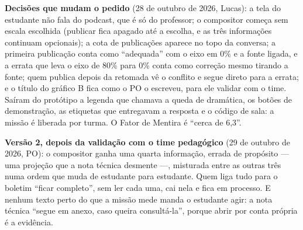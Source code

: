 \textbf{Decisões que mudam o pedido} (28 de outubro de 2026, Lucas): a tela
do estudante não fala do podcast, que é só do professor; o compositor começa
sem escala escolhida (publicar fica apagado até a escolha, e as três
informações continuam opcionais); a cota de publicações aparece no topo da
conversa; a primeira publicação conta como \enquote{adequada} com o eixo em
0\% e a fonte ligada, e a errata que leva o eixo de 80\% para 0\% conta como
correção mesmo tirando a fonte; quem publica depois da retomada vê o conflito e
segue direto para a errata; e o título do gráfico B fica como o PO o
escreveu, para ele validar com o time. Saíram do protótipo a legenda que
chamava a queda de dramática, os botões de demonstração, as etiquetas que
entregavam a resposta e o código de sala: a missão é liberada por turma. O
Fator de Mentira é \enquote{cerca de 6,3}.

\textbf{Versão 2, depois da validação com o time pedagógico} (29 de outubro
de 2026, PO): o compositor ganha uma quarta informação, errada de propósito ---
uma projeção que a nota técnica desmente ---, misturada entre as outras três
numa ordem que muda de estudante para estudante. Quem liga tudo para o boletim
\enquote{ficar completo}, sem ler cada uma, cai nela e fica em processo. E
nenhum texto perto do que a missão mede manda o estudante agir: a nota técnica
\enquote{segue em anexo, caso queira consultá-la}, porque abrir por conta
própria é a evidência.

